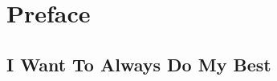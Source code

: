 
\setcounter{footnote}{0}
\setcounter{endnote}{0}

\chapter*{Preface}
\section*{I Want To Always Do My Best}
\par 

\theendnotes